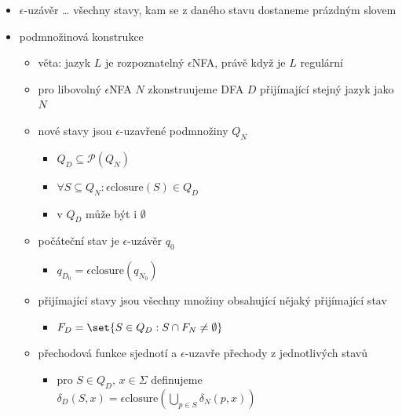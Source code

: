 \begin{itemize}
\begin{itemize}
\begin{itemize}
\item $\delta:Q\times(\Sigma\cup\set{\epsilon})\to \mathcal P(Q)$ \dots{} přechodová funkce vracející podmnožinu $Q$
\item $q_0\in Q$ \dots{} počáteční stav
\begin{itemize}
\item alternativa: množina počátečních stavů $S_0\subseteq Q$
\end{itemize}
\item $F\subseteq Q$ \dots{} množina koncových (přijímajících) stavů
\end{itemize}
\item $\epsilon$-uzávěr \dots{} všechny stavy, kam se z daného stavu dostaneme prázdným slovem
\item podmnožinová konstrukce
\begin{itemize}
\item věta: jazyk $L$ je rozpoznatelný $\epsilon$NFA, právě když je $L$ regulární
\item pro libovolný $\epsilon$NFA $N$ zkonstruujeme DFA $D$ přijímající stejný jazyk jako $N$
\item nové stavy jsou $\epsilon$-uzavřené podmnožiny $Q_N$
\begin{itemize}
\item $Q_D\subseteq\mathcal P(Q_N)$
\item $\forall S\subseteq Q_N:\epsilon\text{closure}(S)\in Q_D$
\item v $Q_D$ může být i $\emptyset$
\end{itemize}
\item počáteční stav je $\epsilon$-uzávěr $q_0$
\begin{itemize}
\item $q_{D_0}=\epsilon\text{closure}(q_{N_0})$
\end{itemize}
\item přijímající stavy jsou všechny množiny obsahující nějaký přijímající stav
\begin{itemize}
\item $F_D=\set{S\in Q_D: S\cap F_N\neq\emptyset}$
\end{itemize}
\item přechodová funkce sjednotí a $\epsilon$-uzavře přechody z jednotlivých stavů
\begin{itemize}
\item pro $S\in Q_D,\,x\in\Sigma$ definujeme $\delta_D(S,x)=\epsilon\text{closure}\left(\bigcup_{p\in S}\delta_N(p,x)\right)$
\end{itemize}

\end{itemize}
\end{itemize}
\end{itemize}
